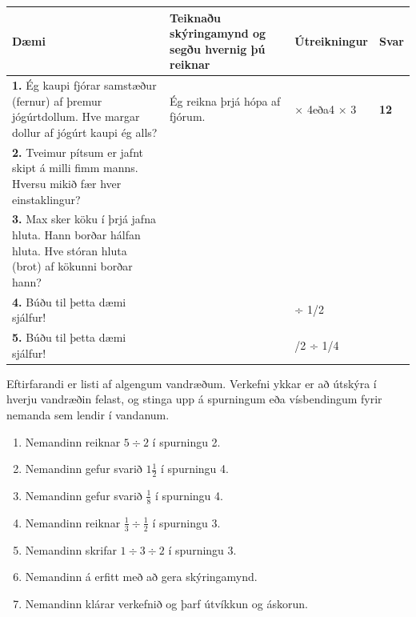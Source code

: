 \documentclass[
  icelandic,
]{book}
\providecommand{\tightlist}{%
  \setlength{\itemsep}{0pt}\setlength{\parskip}{0pt}}
\theoremstyle{definition}
\theoremstyle{definition}
\theoremstyle{definition}
\theoremstyle{definition}
\theoremstyle{remark}
\begin{document}
\begin{longtable}[]{@{}
  >{\raggedright\arraybackslash}p{}
  >{\raggedright\arraybackslash}p{}
  >{\raggedright\arraybackslash}p{}
  >{\raggedright\arraybackslash}p{}@{}}
\toprule\noalign{}
\begin{minipage}[b]{\linewidth}\raggedright
\textbf{Dæmi}
\end{minipage} & \begin{minipage}[b]{\linewidth}\raggedright
\textbf{Teiknaðu skýringamynd og segðu hvernig þú reiknar}
\end{minipage} & \begin{minipage}[b]{\linewidth}\raggedright
\textbf{Útreikningur}
\end{minipage} & \begin{minipage}[b]{\linewidth}\raggedright
\textbf{Svar}
\end{minipage} \\
\midrule\noalign{}
\endhead
\bottomrule\noalign{}
\endlastfoot
\textbf{1.} Ég kaupi fjórar samstæður (fernur) af þremur jógúrtdollum. Hve margar dollur af jógúrt kaupi ég alls? & Ég reikna þrjá hópa af fjórum. & 3 × 4eða4 × 3 & \textbf{12} \\
\textbf{2.} Tveimur pítsum er jafnt skipt á milli fimm manns. Hversu mikið fær hver einstaklingur? & & & \\
\textbf{3.} Max sker köku í þrjá jafna hluta. Hann borðar hálfan hluta. Hve stóran hluta (brot) af kökunni borðar hann? & & & \\
\textbf{4.} Búðu til þetta dæmi sjálfur! & & 3 ÷ 1/2 & \\
\textbf{5.} Búðu til þetta dæmi sjálfur! & & 1/2 ÷ 1/4 & \\
\end{longtable}

Eftirfarandi er listi af algengum vandræðum. Verkefni ykkar er að útskýra í hverju vandræðin felast, og stinga upp á spurningum eða vísbendingum fyrir nemanda sem lendir í vandanum.

\begin{enumerate}
\def\labelenumi{\arabic{enumi}.}
\tightlist
\item
  Nemandinn reiknar \(5 \div 2\) í spurningu 2.
\item
  Nemandinn gefur svarið \(1 \frac{1}{2}\) í spurningu 4.
\item
  Nemandinn gefur svarið \(\frac{1}{8}\) í spurningu 4.
\item
  Nemandinn reiknar \(\frac{1}{3} \div \frac{1}{2}\) í spurningu 3.
\item
  Nemandinn skrifar \(1 \div 3 \div 2\) í spurningu 3.
\item
  Nemandinn á erfitt með að gera skýringamynd.
\item
  Nemandinn klárar verkefnið og þarf útvíkkun og áskorun.
\end{enumerate}
\end{document}
